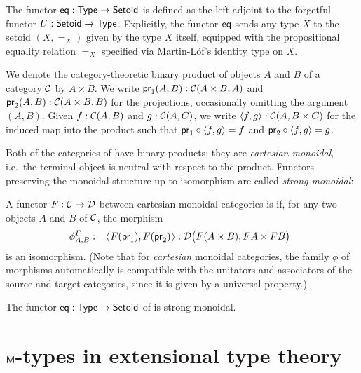 \documentclass[envcountsame]{llncs}
\begin{document}
\begin{definition}\label{def:eq}
 The functor $\eq : \Set\to\Setoid$ is defined as the left adjoint to the forgetful functor $U : \Setoid \to \Set$.
  Explicitly, the functor $\eq$ sends any type $X$ to the setoid $(X,=_X)$ given by the type $X$ itself, equipped
  with the propositional equality relation $=_X$ specified via Martin-L\"of's identity type on $X$.
\end{definition}


\begin{remark}
  We denote the category-theoretic binary product of objects $A$ and $B$ of a category $\C$ by $A\times B$.
  We write $\pr_1(A,B) : \C(A\times B, A)$ and $\pr_2(A,B) :\C(A\times B, B)$ for the projections, occasionally omitting the 
  argument $(A,B)$.
  Given $f : \C(A, B)$ and $g : \C(A,C)$, we write $\langle f,g\rangle : \C(A,B\times C)$ for the induced map into the product such that
  $\comp{\langle f,g\rangle}{\pr_1} = f$ and $\comp{\langle f,g\rangle}{\pr_2} = g$.
\end{remark}

Both of the categories of  have binary products; they are \emph{cartesian monoidal}, i.e.\ the terminal 
object is neutral with respect to the product. Functors preserving the monoidal structure up to isomorphism
are called \emph{strong monoidal}:

\begin{definition}\label{def:monoidal_functor}
 A functor $F:\C\to\D$ between cartesian monoidal categories is  if, for any two objects $A$ and $B$ of $\C$,
  the morphism
 \[ \phi^F_{A,B} := \bigl\langle F(\pr_1), F(\pr_2) \bigr\rangle : \D\bigl(F(A\times B), FA\times FB\bigr)\enspace  \] 
 is an isomorphism.
 (Note that for \emph{cartesian} monoidal categories, the family $\phi$ of morphisms automatically 
  is compatible with the unitators and associators of the source and target categories, 
  since it is given by a universal property.)
\end{definition}

\begin{example}
  The functor $\eq: \Set \to \Setoid$ of  is strong monoidal.
\end{example}


\section{$\M$-types in extensional type theory}
\end{document}
